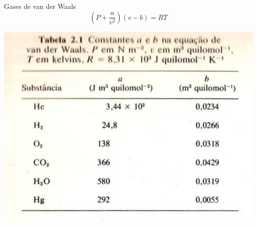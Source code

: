\begin{frame}[c]{Gases de van der Waals}
\[
    \left(P+\frac{a}{v^2}\right)(v-b)=RT
\]

\centering
\includegraphics[height=\textheight-70pt]{images/Captura de tela de 2023-04-12 07-51-46.png}
\end{frame}




